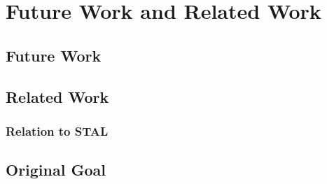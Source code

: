 \chapter{Future Work and Related Work}
\label{chap:future}
\section{Future Work}
\section{Related Work}
\subsection{Relation to STAL}
\section{Original Goal}

